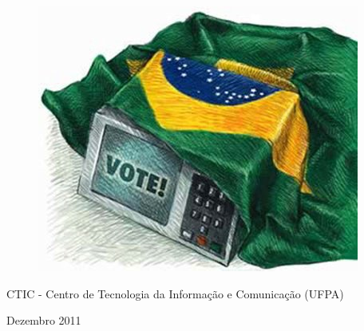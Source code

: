 \thispagestyle{empty}

\begin{center}
  \begin{figure}[H]
    \begin{center}
      \hspace{-1cm}
      \includegraphics[width=0.55\columnwidth]{titlepage}
  ~\cite{FrontPageIMG}
    \end{center}      
  \end{figure}

  \vskip 2cm

  \hspace{-1cm}
  \begin{minipage}[c]{17cm}
    \begin{center}

{\Huge {}\vskip 0.15cm

{\large CTIC - Centro de Tecnologia da Informação e Comunicação (UFPA)}
}
    \end{center}
  \end{minipage}

  \vskip 11cm

  {\Huge Dezembro 2011}

\end{center}
